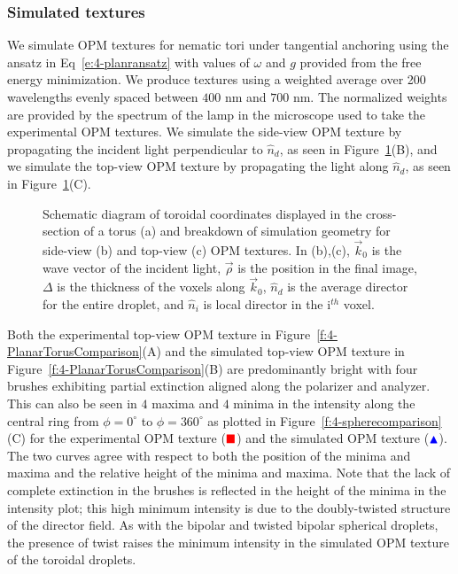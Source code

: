 \subsubsection{Simulated textures}
We simulate OPM textures for nematic tori under tangential anchoring using the ansatz in Eq~\ref{e:4-planransatz} with values of $\omega$ and $g$ provided from the free energy minimization.
We produce textures using a weighted average over 200 wavelengths evenly spaced between $400$ nm and $700$ nm.
The normalized weights are provided by the spectrum of the lamp in the microscope used to take the experimental OPM textures.
We simulate the side-view OPM texture by propagating the incident light perpendicular to $\hat{n}_d$, as seen in Figure~\ref{fig_tourscoords}(B), and we simulate the top-view OPM texture by propagating the light along $\hat{n}_d$, as seen in Figure~\ref{fig_tourscoords}(C).\\
\begin{figure}
\centering
\caption{Schematic diagram of toroidal coordinates displayed in the cross-section of a torus (a) and breakdown of simulation geometry for side-view (b) and top-view (c) OPM textures.
In (b),(c), $\vec{k}_0$ is the wave vector of the incident light, $\vec{\rho}$ is the position in the final image, $\Delta$ is the thickness of the voxels along $\vec{k}_0$, $\hat{n}_d$ is the average director for the entire droplet, and $\hat{n}_i$ is local director in the i$^{th}$ voxel.}\label{fig_tourscoords}
\end{figure}

Both the experimental top-view OPM texture in Figure~\ref{f:4-PlanarTorusComparison}(A) and the simulated top-view OPM texture in Figure~\ref{f:4-PlanarTorusComparison}(B) are predominantly bright with four brushes exhibiting partial extinction aligned along the polarizer and analyzer.
This can also be seen in $4$ maxima and $4$ minima in the intensity along the central ring from $\phi=0^{\circ}$ to $\phi=360^{\circ}$ as plotted in Figure~\ref{f:4-spherecomparison}(C) for the experimental OPM texture ($\color{red}\blacksquare$) and the simulated OPM texture ($\color{blue}\blacktriangle$).
The two curves agree with respect to both the position of the minima and maxima and the relative height of the minima and maxima.
Note that the lack of complete extinction in the brushes is reflected in the height of the minima in the intensity plot; this high minimum intensity is due to the doubly-twisted structure of the director field.
As with the bipolar and twisted bipolar spherical droplets, the presence of twist raises the minimum intensity in the simulated OPM texture of the toroidal droplets.

